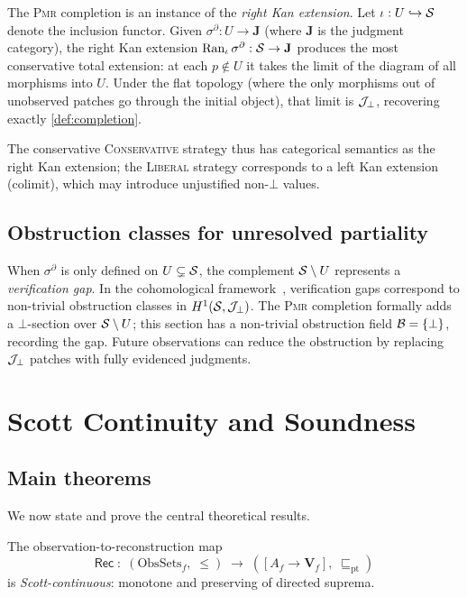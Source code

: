 \documentclass[11pt]{article}
\newcommand{\Apx}{\sqsubseteq}              %
\newcommand{\PMR}{\textsc{Pmr}}            %
\newcommand{\RecAlg}{\mathsf{Rec}}         %
\newcommand{\PVal}{\mathbf{V}}             %
\newcommand{\PartSec}{\sigma^{\partial}}   %
\begin{document}
The \PMR{} completion is an instance of the \emph{right Kan extension}.
Let $\iota : U \hookrightarrow \mathcal{S}$ denote the inclusion functor.
Given $\PartSec : U \to \mathbf{J}$ (where $\mathbf{J}$ is the
judgment category), the right Kan extension
$\mathrm{Ran}_{\iota}\,\PartSec : \Site \to \mathbf{J}$
produces the most conservative total extension: at each $p \notin U$
it takes the limit of the diagram of all morphisms into $U$.  Under
the flat topology (where the only morphisms out of unobserved patches
go through the initial object), that limit is $\mathcal{J}_\bot$, recovering
exactly \cref{def:completion}.

The conservative \textsc{Conservative} strategy thus has categorical
semantics as the right Kan extension; the \textsc{Liberal} strategy
corresponds to a left Kan extension (colimit), which may introduce
unjustified non-$\bot$ values.

\subsection{Obstruction classes for unresolved partiality}

When $\PartSec$ is only defined on $U \subsetneq \mathcal{S}$, the
complement $\mathcal{S} \setminus U$ represents a \emph{verification gap}.
In the \JuGeo{} cohomological framework~\cite{jugeo03}, verification
gaps correspond to non-trivial obstruction classes in
$H^1(\mathcal{S}, \mathcal{J}_\bot)$.  The \PMR{} completion formally adds a
$\bot$-section over $\mathcal{S} \setminus U$; this section has a non-trivial
obstruction field $\mathcal{B} = \{\bot\}$, recording the gap.  Future
observations can reduce the obstruction by replacing $\mathcal{J}_\bot$ patches
with fully evidenced judgments.

\section{Scott Continuity and Soundness}\label{sec:theorem}

\subsection{Main theorems}

We now state and prove the central theoretical results.

\begin{theorem}[Scott continuity of \PMR{}]\label{thm:scott-cont}
The observation-to-reconstruction map
\[
  \RecAlg
  \;:\;
  (\mathrm{ObsSets}_f,\; \leq)
  \;\longrightarrow\;
  ([A_f \to \PVal_f],\; \Apx_\mathrm{pt})
\]
is \emph{Scott-continuous}: monotone and preserving of directed suprema.
\end{theorem}
\end{document}
